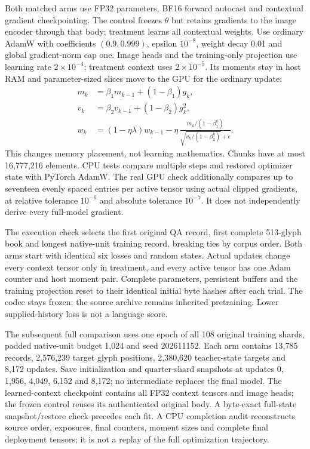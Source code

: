 \documentclass[12pt,a4paper]{article}
\providecommand{\DIFadd}[1]{{\protect\color{blue} \sf #1}} %
\begin{document}
\DIFadd{Both matched arms use FP32 parameters, BF16 forward autocast and contextual
gradient checkpointing. The control freezes $\theta$ but retains gradients to
the image encoder through that body; treatment learns all contextual weights.
Use ordinary AdamW with coefficients $(0.9,0.999)$, epsilon $10^{-8}$, weight
decay 0.01 and global gradient-norm cap one. Image heads and the training-only
projection use learning rate $2\times10^{-4}$; treatment context uses
$2\times10^{-5}$. Its moments stay in host RAM and parameter-sized slices move
to the GPU for the ordinary update:
}\begin{equation}
 \begin{aligned}
 m_k&=\beta_1m_{k-1}+(1-\beta_1)g_k,\\
 v_k&=\beta_2v_{k-1}+(1-\beta_2)g_k^2,\\
 w_k&=(1-\eta\lambda)w_{k-1}
 -\eta\,\frac{m_k/(1-\beta_1^k)}{\sqrt{v_k/(1-\beta_2^k)}+\epsilon}.
 \end{aligned}
 \label{eq:host-moment-adamw}
\end{equation}
\DIFadd{This changes memory placement, not learning mathematics. Chunks have at most
16,777,216 elements. CPU tests compare multiple steps and restored optimizer
state with PyTorch AdamW. The real GPU check additionally compares up to
seventeen evenly spaced entries per active tensor using actual clipped
gradients, at relative tolerance $10^{-6}$ and absolute tolerance $10^{-7}$.
It does not independently derive every full-model gradient.
}

\DIFadd{The execution check selects the first original QA record, first complete
513-glyph book and longest native-unit training record, breaking ties by corpus
order. Both arms start with identical six losses and random states. Actual
updates change every context tensor only in treatment, and every active tensor
has one Adam counter and host moment pair. Complete parameters, persistent
buffers and the training projection reset to their identical initial byte
hashes after each trial. The codec stays frozen; the source archive remains
inherited pretraining. Lower supplied-history loss is not a language score.
}

\DIFadd{The subsequent full comparison uses one epoch of all 108 original training
shards, padded native-unit budget 1,024 and seed 202611152. Each arm contains
13,785 records, 2,576,239 target glyph positions, 2,380,620 teacher-state targets
and 8,172 updates. Save initialization and quarter-shard snapshots at updates
0, 1,956, 4,049, 6,152 and 8,172; no intermediate replaces the final model.
The learned-context checkpoint contains all FP32 context tensors and image
heads; the frozen control reuses its authenticated original body. A byte-exact
full-state snapshot/restore check precedes each fit. A CPU completion audit
reconstructs source order, exposures, final counters, moment sizes and complete
final deployment tensors; it is not a replay of the full optimization trajectory.
}
\end{document}
